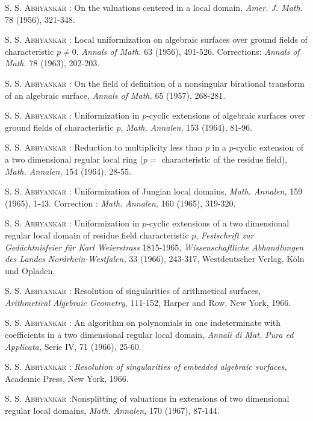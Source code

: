 \begin{thebibliography}{99}\pageoriginale
{} \textsc{S. S. Abhyankar :} On the valuations centered in a local domain, {\em Amer. J. Math.} 78 (1956), 321-348.

 \textsc{S. S. Abhyankar :} Local uniformization on algebraic surfaces over ground fields of characteristic $p\neq 0$, {\em Annals of Math.} 63 (1956), 491-526. Corrections: {\em Annals of Math.} 78 (1963), 202-203.

 \textsc{S. S. Abhyankar :} On the field of definition of a nonsingular birational transform of an algebraic surface, {\em Annals of Math.} 65 (1957), 268-281.

 \textsc{S. S. Abhyankar :} Uniformization in $p$-cyclic extensions of algebraic surfaces over ground fields of characteristic $p$, {\em Math. Annalen,} 153 (1964), 81-96.

 \textsc{S. S. Abhyankar :} Reduction to multiplicity less than $p$ in a $p$-cyclic extension of a two dimensional regular local ring ($p={}$ characteristic of the residue field), {\em Math. Annalen,} 154 (1964), 28-55.

 \textsc{S. S. Abhyankar :} Uniformization of Jungian local domains, {\em Math. Annalen,} 159 (1965), 1-43. Correction : {\em Math. Annalen,} 160 (1965), 319-320.

 \textsc{S. S. Abhyankar :} Uniformization in $p$-cyclic extensions of a two dimensional regular local domain of residue field characteristic $p$, {\em Festschrift zur Ged\"achtnisfeier f\"ur Karl Weierstrass} 1815-1965, {\em Wissenschaftliche Abhandlungen des Landes Nordrhein-Westfalen,} 33 (1966), 243-317, Westdeutscher Verlag, K\"oln und Opladen.

 \textsc{S. S. Abhyankar :} Resolution of singularities of arithmetical surfaces, {\em Arithmetical Algebraic Geometry}, 111-152, Harper and Row, New York, 1966.

 \textsc{S. S. Abhyankar :} An algorithm on polynomials in one indeterminate with coefficients in a two dimensional regular local domain, {\em Annali di Mat. Pura ed Applicata,} Serie IV, 71 (1966), 25-60.

 \textsc{S. S. Abhyankar :} {\em Resolution of singularities of embedded algebraic surfaces,} Academic Press, New York, 1966.

 \textsc{S. S. Abhyankar :}\pageoriginale Nonsplitting of valuations in extensions of two dimensional regular local domains, {\em Math. Annalen,} 170 (1967), 87-144.


\end{thebibliography}

